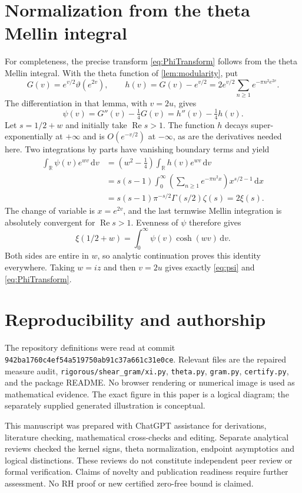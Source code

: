 \documentclass[11pt,letterpaper]{article}
\numberwithin{equation}{section}
\theoremstyle{definition}
\theoremstyle{remark}
\newcommand{\R}{\mathbb R}
\newcommand{\dd}{\,\mathrm d}
\newcommand{\Repart}{\operatorname{Re}}
\begin{document}
\section{Normalization from the theta Mellin integral}\label{app:normalization}
For completeness, the precise transform \eqref{eq:PhiTransform} follows from the theta Mellin integral. With the theta function of \cref{lem:modularity}, put
\[
G(v)=e^{v/2}\vartheta(e^{2v}),\qquad
h(v)=G(v)-e^{v/2}=2e^{v/2}\sum_{n\ge1}e^{-\pi n^2e^{2v}}.
\]
The differentiation in that lemma, with $v=2u$, gives
\[
\psi(v)=G''(v)-\tfrac14G(v)=h''(v)-\tfrac14h(v).
\]
Let $s=1/2+w$ and initially take $\Repart s>1$. The function $h$ decays super-exponentially at $+\infty$ and is $O(e^{-v/2})$ at $-\infty$, as are the derivatives needed here. Two integrations by parts have vanishing boundary terms and yield
\begin{align*}
\int_\R\psi(v)e^{wv}\dd v
&=(w^2-\tfrac14)\int_\R h(v)e^{wv}\dd v\\
&=s(s-1)\int_0^\infty
\left(\sum_{n\ge1}e^{-\pi n^2x}\right)x^{s/2-1}\dd x\\
&=s(s-1)\pi^{-s/2}\Gamma(s/2)\zeta(s)=2\xi(s).
\end{align*}
The change of variable is $x=e^{2v}$, and the last termwise Mellin integration is absolutely convergent for $\Repart s>1$. Evenness of $\psi$ therefore gives
\[
\xi(1/2+w)=\int_0^\infty\psi(v)\cosh(wv)\dd v.
\]
Both sides are entire in $w$, so analytic continuation proves this identity everywhere. Taking $w=iz$ and then $v=2u$ gives exactly \eqref{eq:psi} and \eqref{eq:PhiTransform}.

\section{Reproducibility and authorship}
The repository definitions were read at commit \texttt{942ba1760c4ef54a519750ab91c37a661c31e0ce}. Relevant files are the repaired measure audit, \texttt{rigorous/shear\_gram/xi.py}, \texttt{theta.py}, \texttt{gram.py}, \texttt{certify.py}, and the package README. No browser rendering or numerical image is used as mathematical evidence. The exact figure in this paper is a logical diagram; the separately supplied generated illustration is conceptual.

This manuscript was prepared with ChatGPT assistance for derivations, literature checking, mathematical cross-checks and editing. Separate analytical reviews checked the kernel signs, theta normalization, endpoint asymptotics and logical distinctions. These reviews do not constitute independent peer review or formal verification. Claims of novelty and publication readiness require further assessment. No RH proof or new certified zero-free bound is claimed.
\end{document}
